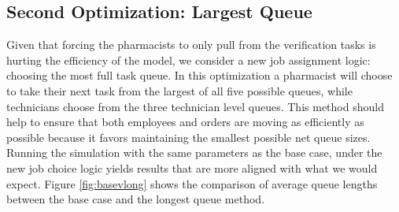 \documentclass[10pt]{report}            %
\begin{document}
\subsection*{Second Optimization: Largest Queue}
Given that forcing the pharmacists to only pull from the verification tasks is hurting the efficiency of the model, we consider a new job assignment logic: choosing the most full task queue. In this optimization a pharmacist will choose to take their next task from the largest of all five possible queues, while technicians choose from the three technician level queues. This method should help to ensure that both employees and orders are moving as efficiently as possible because it favors maintaining the smallest possible net queue sizes. Running the simulation with the same parameters as the base case, under the new job choice logic yields results that are more aligned with what we would expect. Figure \ref{fig:basevlong} shows the comparison of average queue lengths between the base case and the longest queue method.
\end{document}
